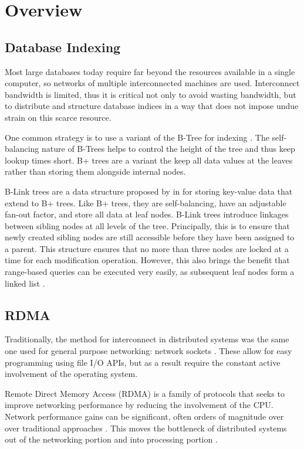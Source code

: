\chapter{Overview}

\section{Database Indexing}
Most large databases today require far beyond the resources available in a single computer, so networks of multiple interconnected machines are used. Interconnect bandwidth is limited, thus it is critical not only to avoid wasting bandwidth, but to distribute and structure database indices in a way that does not impose undue strain on this scarce resource.

One common strategy is to use a variant of the B-Tree for indexing \autocite{ma-tpds-2022}. The self-balancing nature of B-Trees helps to control the height of the tree and thus keep lookup times short. B+ trees are a variant the keep all data values at the leaves rather than storing them alongside internal nodes.

B-Link trees are a data structure proposed by \citeauthor{b-link} in \citeyear{b-link} for storing key-value data that extend to B+ trees. Like B+ trees, they are self-balancing, have an adjustable fan-out factor, and store all data at leaf nodes.
B-Link trees introduce linkages between sibling nodes at all levels of the tree. Principally, this is to ensure that newly created sibling nodes are still accessible before they have been assigned to a parent. This structure ensures that no more than three nodes are locked at a time for each modification operation. However, this also brings the benefit that range-based queries can be executed very easily, as subsequent leaf nodes form a linked list \autocite{b-link}.


\section{RDMA}

Traditionally, the method for interconnect in distributed systems was the same one used for general purpose networking: network sockets \autocite{binnig-vldb-2016}. These allow for easy programming using file I/O APIs, but as a result require the constant active involvement of the operating system.

Remote Direct Memory Access (RDMA) is a family of protocols that seeks to improve networking performance by reducing the involvement of the CPU. Network performance gains can be significant, often orders of magnitude over over traditional approaches \autocite{ma-tpds-2022,rdma-reads}. This moves the bottleneck of distributed systems out of the networking portion and into processing portion \autocite{binnig-vldb-2016}.

